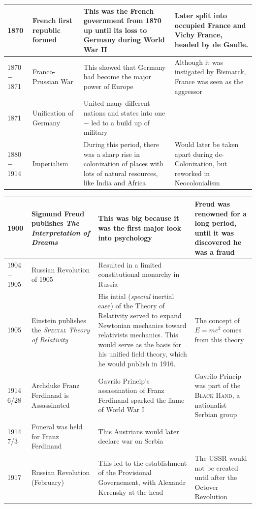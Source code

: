 \documentclass[12pt]{article}
\begin{document}
\begin{enumerate}
\begin{tabular}{|p{}|p{}|p{}|p{}|}
\hline
1870 & French first republic formed  & This was the French government from 1870 up until its loss to Germany during World War II  & Later split into occupied France and Vichy France, headed by de Gaulle.  \\
\hline
1870$-$1871 & Franco-Prussian War  & This showed that Germany had become the major power of Europe  & Although it was instigated by Bismarck, France was seen as the aggressor  \\
\hline
1871 & Unification of Germany  & United many different nations and states into one $-$ led to a build up of military  &    \\
\hline
1880$-$1914 & Imperialism  & During this period, there was a sharp rise in colonization of places with lots of natural resources, like India and Africa  & Would later be taken apart during de-Colonization, but reworked in Neocolonialism  \\
\hline
\end{tabular}
\newpage
\hspace{-25pt}\begin{tabular}{|p{}|p{}|p{}|p{}|}
\hline
1900 & Sigmund Freud publishes \textit{The Interpretation of Dreams}  & This was big because it was the first major look into psychology  & Freud was renowned for a long period, until it was discovered he was a fraud  \\
\hline
1904$-$1905 & Russian Revolution of 1905 & Resulted in a limited constitutional monarchy in Russia  &  \\
\hline
    1905 & Einstein publishes the \textit{\textsc{Special} Theory of Relativity} & His intial (\textit{special} inertial case) of the Theory of Relativity served to expand Newtonian mechanics toward relativists mechanics. This would serve as the basis for his unified field theory, which he would publish in 1916. &  The concept of $E=mc^2$ comes from this theory \\
\hline
    1914 6/28 & Archduke Franz Ferdinand is Assassinated  & Gavrilo Princip's assassination of Franz Ferdinand sparked the flame of World War I  & Gavrilo Princip was part of the \textsc{Black Hand}, a nationalist Serbian group \\
\hline
1914 7/3 & Funeral was held for Franz Ferdinand  & This Austrians would later declare war on Serbia  & \\
\hline
1917 & Russian Revolution (February)  & This led to the establishment of the Provisional Governement, with Alexandr Kerensky at the head  & The USSR would not be created until after the Octover Revolution \\

\end{tabular}
\end{enumerate}
\end{document}
